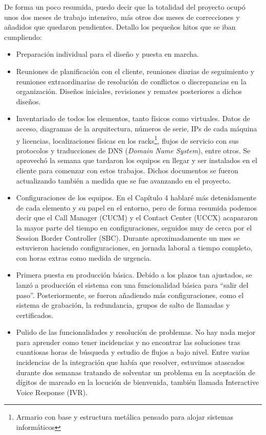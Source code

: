 \documentclass[a4paper, 12pt]{book}
\begin{document}
De forma un poco resumida, puedo decir que la totalidad del proyecto ocupó unos dos meses de trabajo intensivo, más otros dos meses de correcciones y añadidos que quedaron pendientes. Detallo los pequeños hitos que se iban cumpliendo:
\begin{itemize}
  \item Preparación individual para el diseño y puesta en marcha.
  
  \item Reuniones de planificación con el cliente, reuniones diarias de seguimiento y reuniones extraordinarias de resolución de conflictos o discrepancias en la organización. Diseños iniciales, revisiones y remates posteriores a dichos diseños.

  \item Inventariado de todos los elementos, tanto físicos como virtuales. Datos de acceso, diagramas de la arquitectura, números de serie, IPs de cada máquina y licencias, localizaciones físicas en los racks\footnote{Armario con base y estructura metálica pensado para alojar sistemas informáticos}, flujos de servicio con sus protocolos y traducciones de DNS (\emph{Domain Name System}), entre otros. Se aprovechó la semana que tardaron los equipos en llegar y ser instalados en el cliente para comenzar con estos trabajos. Dichos documentos se fueron actualizando también a medida que se fue avanzando en el proyecto.

  \item Configuraciones de los equipos. En el Capítulo 4 hablaré más detenidamente de cada elemento y su papel en el entorno, pero de forma resumida podemos decir que el Call Manager (CUCM) y el Contact Center (UCCX) acapararon la mayor parte del tiempo en configuraciones, seguidos muy de cerca por el Session Border Controller (SBC). Durante aproximadamente un mes se estuvieron haciendo configuraciones, en jornada laboral a tiempo completo, con horas extras como medida de urgencia.

  \item Primera puesta en producción básica. Debido a los plazos tan ajustados, se lanzó a producción el sistema con una funcionalidad básica para ``salir del paso''. Posteriormente, se fueron añadiendo más configuraciones, como el sistema de grabación, la redundancia, grupos de salto de llamadas y certificados.

  \item Pulido de las funcionalidades y resolución de problemas. No hay nada mejor para aprender como tener incidencias y no encontrar las soluciones tras cuantiosas horas de búsqueda y estudio de flujos a bajo nivel. Entre varias incidencias de la integración que había que resolver, estuvimos atascados durante dos semanas tratando de solventar un problema en la aceptación de dígitos de marcado en la locución de bienvenida, también llamada Interactive Voice Response (IVR).
  

\end{itemize}
\end{document}
